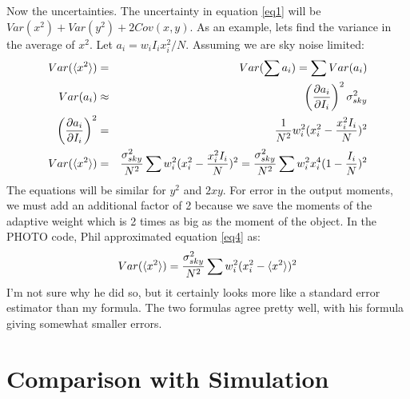 \documentclass[preprint]{aastex}
\begin{document}
Now the uncertainties. The uncertainty in equation \ref{eq1} will be
$Var(x^2)+Var(y^2) + 2Cov(x,y)$. As an example, lets find the variance in the average
of $x^2$. Let $a_i = w_i I_i x_i^2/N$. Assuming we are sky noise limited:
\begin{eqnarray}
Var(\langle x^2 \rangle) & = & Var( \sum a_i ) = \sum Var(a_i) \\
                Var(a_i) & \approx & \left({ {\partial a_i} \over {\partial I_i}
                }\right)^2 \sigma_{sky}^2 \\
\left({ {\partial a_i} \over {\partial I_i}}\right)^2 & = & {1 \over N^2 } w_i^2(x_i^2 -
                { {x_i^2I_i} \over N})^2 \\
Var(\langle x^2 \rangle) & = & {\sigma_{sky}^2 \over N^2 } \sum w_i^2(x_i^2 -
                { {x_i^2I_i} \over N})^2 = {\sigma_{sky}^2 \over N^2 } \sum
                w_i^2 x_i^4 (1 - { {I_i} \over N})^2 \label{eq4}
\end{eqnarray}
The equations will be similar for $y^2$ and $2xy$. For error in the output
moments, we must add an additional factor of 2 because we save the moments of
the adaptive weight which is 2 times as big as the moment of the object. 
In the PHOTO code, Phil approximated equation \ref{eq4} as:
\begin{equation}
Var(\langle x^2 \rangle) = {\sigma_{sky}^2 \over N^2 } \sum w_i^2(x_i^2 -
                \langle x^2 \rangle)^2
\end{equation}
I'm not sure why he did so, but it certainly looks more like a standard error
estimator than my formula. The two formulas agree pretty
well, with his formula giving somewhat smaller errors.

\section{Comparison with Simulation}
\end{document}
